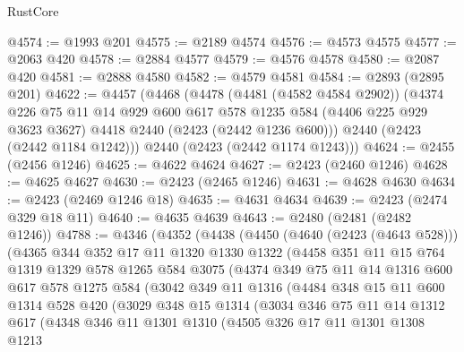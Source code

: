 \begin{lexlean}{RustCore}
\begin{coremodule}
@4574 := @1993 @201
@4575 := @2189 @4574
@4576 := @4573 @4575
@4577 := @2063 @420
@4578 := @2884 @4577
@4579 := @4576 @4578
@4580 := @2087 @420
@4581 := @2888 @4580
@4582 := @4579 @4581
@4584 := @2893 (@2895 @201)
@4622 := @4457
    (@4468
      (@4478
        (@4481 (@4582 @4584 @2902))
        (@4374
          @226
          @75
          @11
          @14
          @929
          @600
          @617
          @578
          @1235
          @584
          (@4406 @225 @929 @3623 @3627)
          @4418
          @2440
          (@2423 (@2442 @1236 @600)))
        @2440
        (@2423 (@2442 @1184 @1242)))
      @2440
      (@2423 (@2442 @1174 @1243)))
@4624 := @2455 (@2456 @1246)
@4625 := @4622 @4624
@4627 := @2423 (@2460 @1246)
@4628 := @4625 @4627
@4630 := @2423 (@2465 @1246)
@4631 := @4628 @4630
@4634 := @2423 (@2469 @1246 @18)
@4635 := @4631 @4634
@4639 := @2423 (@2474 @329 @18 @11)
@4640 := @4635 @4639
@4643 := @2480 (@2481 (@2482 @1246))
@4788 := @4346
    (@4352
      (@4438
        (@4450
          (@4640 (@2423 (@4643 @528)))
          (@4365
            @344
            @352
            @17
            @11
            @1320
            @1330
            @1322
            (@4458
              @351
              @11
              @15
              @764
              @1319
              @1329
              @578
              @1265
              @584
              @3075
              (@4374
                @349
                @75
                @11
                @14
                @1316
                @600
                @617
                @578
                @1275
                @584
                (@3042
                  @349
                  @11
                  @1316
                  (@4484
                    @348
                    @15
                    @11
                    @600
                    @1314
                    @528
                    @420
                    (@3029
                      @348
                      @15
                      @1314
                      (@3034
                        @346
                        @75
                        @11
                        @14
                        @1312
                        @617
                        (@4348
                          @346
                          @11
                          @1301
                          @1310
                          (@4505
                            @326
                            @17
                            @11
                            @1301
                            @1308
                            @1213

\end{coremodule}
\end{lexlean}
